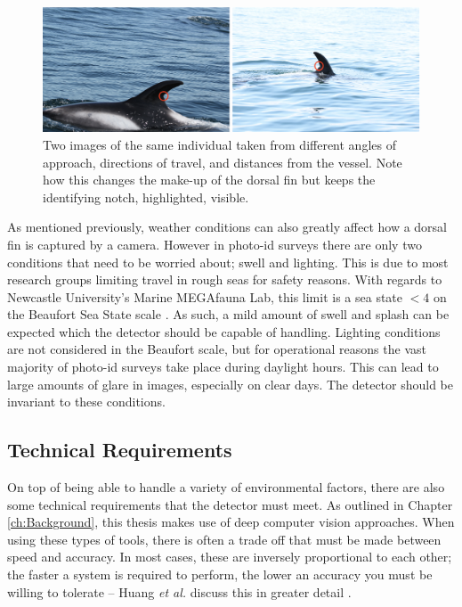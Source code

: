    \begin{figure}
 	\begin{center}
 		\includegraphics[scale=0.6]{Chapter3/figs/angle-size-example.png}
 	\end{center}
 	\caption[Two images of the same individual taken from different angles of approach, directions of travel, and distances from the vessel.]{Two images of the same individual taken from different angles of approach, directions of travel, and distances from the vessel. Note how this changes the make-up of the dorsal fin but keeps the identifying notch, highlighted, visible. 
 	}
 	\label{fig:angle-eg}
 \end{figure}
 
 As mentioned previously, weather conditions can also greatly affect how a dorsal fin is captured by a camera. However in photo-id surveys there are only two conditions that need to be worried about; swell and lighting. This is due to most research groups limiting travel in rough seas for safety reasons. With regards to Newcastle University's Marine MEGAfauna Lab, this limit is a sea state $<4$ on the Beaufort Sea State scale \cite{world_meteorologicial_society_beaufort_1970}. As such, a mild amount of swell and splash can be expected which the detector should be capable of handling. Lighting conditions are not considered in the Beaufort scale, but for operational reasons the vast majority of photo-id surveys take place during daylight hours. This can lead to large amounts of glare in images, especially on clear days. The detector should be invariant to these conditions. 
 
 \subsection{Technical Requirements}\label{ch:cetDet,sec:requirements,sub:technical}
 
On top of being able to handle a variety of environmental factors, there are also some technical requirements that the detector must meet. As outlined in Chapter \ref{ch:Background}, this thesis makes use of deep computer vision approaches. When using these types of tools, there is often a trade off that must be made between speed and accuracy. In most cases, these are inversely proportional to each other; the faster a system is required to perform, the lower an accuracy you must be willing to tolerate -- Huang \textit{et al.} discuss this in greater detail \cite{huang_speedaccuracy_2017}.
 
